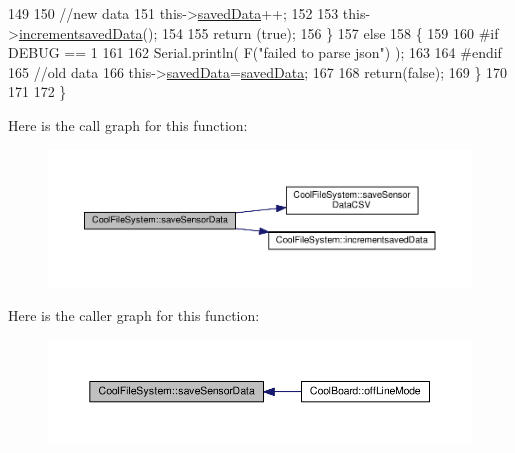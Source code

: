 \begin{DoxyCode}
149 
150         \textcolor{comment}{//new data}
151         this->\hyperlink{class_cool_file_system_ad9f5b739a32100f5f21270c3d9ee2b1d}{savedData}++;
152 
153         this->\hyperlink{class_cool_file_system_aae045125288f255f3e258073dcada2a6}{incrementsavedData}();
154         
155         \textcolor{keywordflow}{return} (\textcolor{keyword}{true});      
156     \}
157     \textcolor{keywordflow}{else}
158     \{
159     
160 \textcolor{preprocessor}{    #if DEBUG == 1}
161 
162         Serial.println( F(\textcolor{stringliteral}{"failed to parse json"}) );
163     
164 \textcolor{preprocessor}{    #endif}
165         \textcolor{comment}{//old data}
166         this->\hyperlink{class_cool_file_system_ad9f5b739a32100f5f21270c3d9ee2b1d}{savedData}=\hyperlink{class_cool_file_system_ad9f5b739a32100f5f21270c3d9ee2b1d}{savedData};
167 
168         \textcolor{keywordflow}{return}(\textcolor{keyword}{false});
169     \}
170     
171 
172 \}
\end{DoxyCode}
Here is the call graph for this function\+:\nopagebreak
\begin{figure}[H]
\begin{center}
\leavevmode
\includegraphics[width=350pt]{db/d0c/class_cool_file_system_afa3a4feae94871d4d3b6bebb701c2e67_cgraph}
\end{center}
\end{figure}
Here is the caller graph for this function\+:\nopagebreak
\begin{figure}[H]
\begin{center}
\leavevmode
\includegraphics[width=350pt]{db/d0c/class_cool_file_system_afa3a4feae94871d4d3b6bebb701c2e67_icgraph}
\end{center}
\end{figure}
\mbox{\label{class_cool_file_system_ab78704d5d21ce10fc6f1138ab5ab46c8}} 
